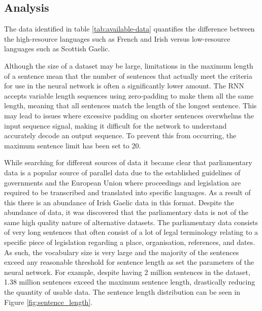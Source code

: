 \subsection{Analysis}

The data identified in table \ref{tab:available-data} quantifies the difference between the high-resource languages such as French and Irish versus low-resource languages such as Scottish Gaelic. 



Although the size of a dataset may be large, limitations in the maximum length of a sentence mean that the number of sentences that actually meet the criteria for use in the neural network is often a significantly lower amount. The RNN accepts variable length sequences using zero-padding to make them all the same length, meaning that all sentences match the length of the longest sentence. This may lead to issues where excessive padding on shorter sentences overwhelms the input sequence signal, making it difficult for the network to understand accurately decode an output sequence. To prevent this from occurring, the maximum sentence limit has been set to 20.

While searching for different sources of data it became clear that parliamentary data is a popular source of parallel data due to the established guidelines of governments and the European Union where proceedings and legislation are required to be transcribed and translated into specific languages. As a result of this there is an abundance of Irish Gaelic data in this format. Despite the abundance of data, it was discovered that the parliamentary data is not of the same high quality nature of alternative datasets. The parliamentary data consists of very long sentences that often consist of a lot of legal terminology relating to a specific piece of legislation regarding a place, organisation, references, and dates. 
As such, the vocabulary size is very large and the majority of the sentences exceed any reasonable threshold for sentence length as set the parameters of the neural network. For example, despite having 2 million sentences in the \cite{french_corpus_2005} dataset, 1.38 million sentences exceed the maximum sentence length, drastically reducing the quantity of usable data. The sentence length distribution can be seen in Figure \ref{fig:sentence_length}.

